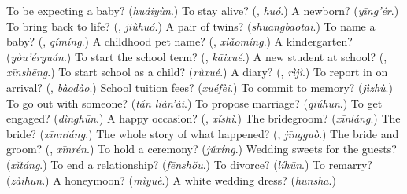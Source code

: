 \begin{tcolorbox}[breakable,colback=teal!4,colframe=teal!35!black,title={Before you move on}]
To be expecting a baby? (\emph{huáiyùn}.) To stay alive? (\textbf{}, \emph{huó}.) A newborn? (\emph{yīng'ér}.) To bring back to life? (\textbf{}, \emph{jiùhuó}.) A pair of twins? (\emph{shuāngbāotāi}.) To name a baby? (\textbf{}, \emph{qǐmíng}.) A childhood pet name? (\textbf{}, \emph{xiǎomíng}.) A kindergarten? (\emph{yòu'éryuán}.) To start the school term? (\textbf{}, \emph{kāixué}.) A new student at school? (\textbf{}, \emph{xīnshēng}.) To start school as a child? (\emph{rùxué}.) A diary? (\textbf{}, \emph{rìjì}.) To report in on arrival? (\textbf{}, \emph{bàodào}.) School tuition fees? (\emph{xuéfèi}.) To commit to memory? (\emph{jìzhù}.) To go out with someone? (\emph{tán liàn'ài}.) To propose marriage? (\emph{qiúhūn}.) To get engaged? (\emph{dìnghūn}.) A happy occasion? (\textbf{}, \emph{xǐshì}.) The bridegroom? (\emph{xīnláng}.) The bride? (\emph{xīnniáng}.) The whole story of what happened? (\textbf{}, \emph{jīngguò}.) The bride and groom? (\textbf{}, \emph{xīnrén}.) To hold a ceremony? (\emph{jǔxíng}.) Wedding sweets for the guests? (\emph{xǐtáng}.) To end a relationship? (\emph{fēnshǒu}.) To divorce? (\emph{líhūn}.) To remarry? (\emph{zàihūn}.) A honeymoon? (\emph{mìyuè}.) A white wedding dress? (\emph{hūnshā}.)
\end{tcolorbox}
